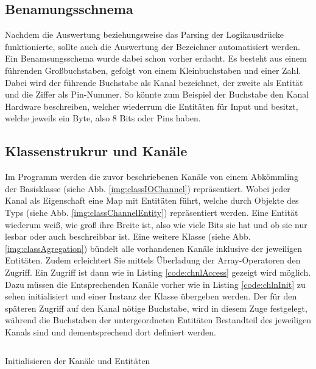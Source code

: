 \subsection{Benamungsschnema}
Nachdem die Auswertung beziehungsweise das Parsing der Logikausdrücke funktionierte, sollte auch die Auswertung der Bezeichner automatisiert werden. Ein Benamsungsschema wurde dabei schon vorher erdacht. Es besteht aus einem führenden Großbuchstaben, gefolgt von einem Kleinbuchstaben und einer Zahl. Dabei wird der führende Buchstabe als Kanal bezeichnet, der zweite als Entität und die Ziffer als Pin-Nummer. So könnte zum Beispiel der Buchstabe  den Kanal Hardware beschreiben, welcher  wiederrum die Entitäten  für Input und  besitzt, welche jeweils ein Byte, also 8 Bits oder Pins haben. 

\subsection{Klassenstrukrur und Kanäle}
Im Programm werden die zuvor beschriebenen Kanäle von einem Abkömmling der Basisklasse  (siehe Abb. \ref{img:classIOChannel}) repräsentiert. Wobei jeder Kanal als Eigenschaft eine Map mit Entitäten führt, welche durch Objekte des Typs  (siehe Abb. \ref{img:classChannelEntity}) repräsentiert werden. Eine Entität wiederum weiß, wie groß ihre Breite ist, also wie viele Bits sie hat und ob sie nur lesbar oder auch beschreibbar ist. Eine weitere Klasse  (siehe Abb. \ref{img:classAgregation}) bündelt alle vorhandenen Kanäle inklusive der jeweiligen Entitäten. Zudem erleichtert Sie mittels Überladung der Array-Operatoren den Zugriff. Ein Zugriff ist dann wie in Listing \ref{code:chnlAccess} gezeigt wird möglich. Dazu müssen die Entsprechenden Kanäle vorher wie in Listing \ref{code:chlnInit} zu sehen initialisiert und einer Instanz der Klasse  übergeben werden. Der für den späteren Zugriff auf den Kanal nötige Buchstabe, wird in diesem Zuge festgelegt, während die Buchstaben der untergeordneten Entitäten Bestandteil des jeweiligen Kanals sind und dementsprechend dort definiert werden. 


\begin{listing}[H]
	\inputminted[numbersep=1pt,fontsize=\scriptsize,frame=single, firstline=364,lastline=369]{c}{./code/main-klassenstruktur.cpp}
	\caption{Initialisieren der Kanäle und Entitäten}
	\label{code:chlnInit}
\end{listing}


